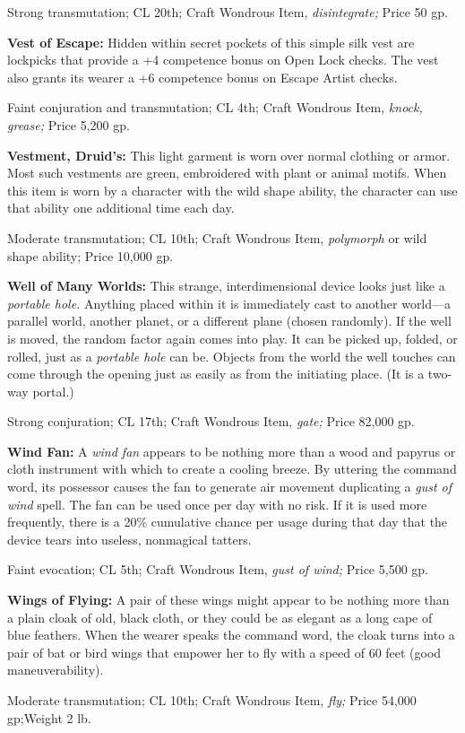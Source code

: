 \documentclass{article}
\begin{document}
Strong transmutation; CL 20th; Craft Wondrous Item, \textit{disintegrate; }Price 
50 gp.

\textbf{Vest of Escape:} Hidden within secret pockets of this simple silk vest 
are lockpicks that provide a +4 competence bonus on Open Lock checks. The vest 
also grants its wearer a +6 competence bonus on Escape Artist checks.

Faint conjuration and transmutation; CL 4th; Craft Wondrous Item, \textit{knock, 
grease; }Price 5,200 gp.

\textbf{Vestment, Druid's:} This light garment is worn over normal clothing or 
armor. Most such vestments are green, embroidered with plant or animal motifs. 
When this item is worn by a character with the wild shape ability, the character 
can use that ability one additional time each day.

Moderate transmutation; CL 10th; Craft Wondrous Item, \textit{polymorph }or wild 
shape ability; Price 10,000 gp.

\textbf{Well of Many Worlds:} This strange, interdimensional device looks just 
like a \textit{portable hole. }Anything placed within it is immediately cast to 
another world---a parallel world, another planet, or a different plane (chosen 
randomly). If the well is moved, the random factor again comes into play. It can 
be picked up, folded, or rolled, just as a \textit{portable hole }can be. Objects 
from the world the well touches can come through the opening just as easily as 
from the initiating place. (It is a two-way portal.)

Strong conjuration; CL 17th; Craft Wondrous Item, \textit{gate; }Price 82,000 gp.

\textbf{Wind Fan:} A \textit{wind fan }appears to be nothing more than a wood and 
papyrus or cloth instrument with which to create a cooling breeze. By uttering 
the command word, its possessor causes the fan to generate air movement duplicating 
a \textit{gust of wind }spell. The fan can be used once per day with no risk. If 
it is used more frequently, there is a 20\% cumulative chance per usage during 
that day that the device tears into useless, nonmagical tatters.

Faint evocation; CL 5th; Craft Wondrous Item, \textit{gust of wind; }Price 5,500 
gp.

\textbf{Wings of Flying:} A pair of these wings might appear to be nothing more 
than a plain cloak of old, black cloth, or they could be as elegant as a long cape 
of blue feathers. When the wearer speaks the command word, the cloak turns into 
a pair of bat or bird wings that empower her to fly with a speed of 60 feet (good 
maneuverability).

Moderate transmutation; CL 10th; Craft Wondrous Item, \textit{fly; }Price 54,000 
gp;Weight 2 lb.

\newpage
\end{document}
